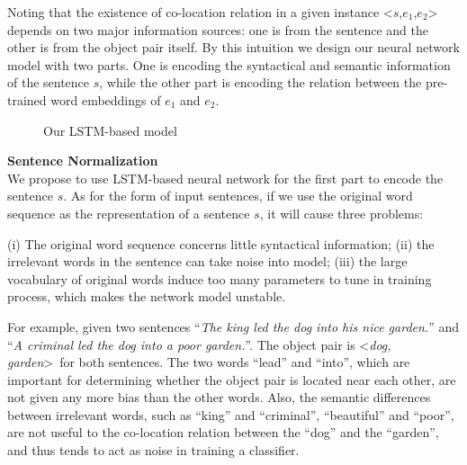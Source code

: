 Noting that the existence of co-location relation in 
a given instance \textless $s$,$e_1$,$e_2$\textgreater~ depends 
on two major information sources: one is from the sentence 
and the other is from the object pair itself.
By this intuition we design our neural network model with two parts.
One is encoding the syntactical and semantic information of the sentence $s$, while the other part is encoding the relation between the pre-trained word embeddings of $e_1$ and $e_2$.


\begin{figure*}[th]
	\centering
	\caption{Our LSTM-based model}
	\label{fig:LSTM}
\end{figure*}

\noindent 
\textbf{Sentence Normalization}\\
We propose to use LSTM-based neural network for the first part to encode the sentence $s$.
As for the form of input sentences, 
if we use the original word sequence as the representation of a sentence $s$,  
it will cause three problems:

(i) The original word sequence concerns little syntactical information;
(ii) the irrelevant words in the sentence can take noise into model; 
(iii) the large vocabulary of original words induce too many parameters to tune in training process, which makes the network model unstable.

For example, given two sentences 
``\textit{The king led the dog into his nice garden.}'' and 
``\textit{A criminal led the dog into a poor garden.}''. 
The object pair is \textless \textit{dog, garden}\textgreater~for 
both sentences. The two words ``lead'' and ``into'', which are important
for determining whether the object pair is located near each other, are 
not given any more bias than the other words. 
Also, the semantic differences between irrelevant words, such as ``king'' and ``criminal'', ``beautiful'' and ``poor'', are not useful to the co-location
relation between the ``dog'' and the ``garden'', and 
thus tends to act as noise in training a classifier.

